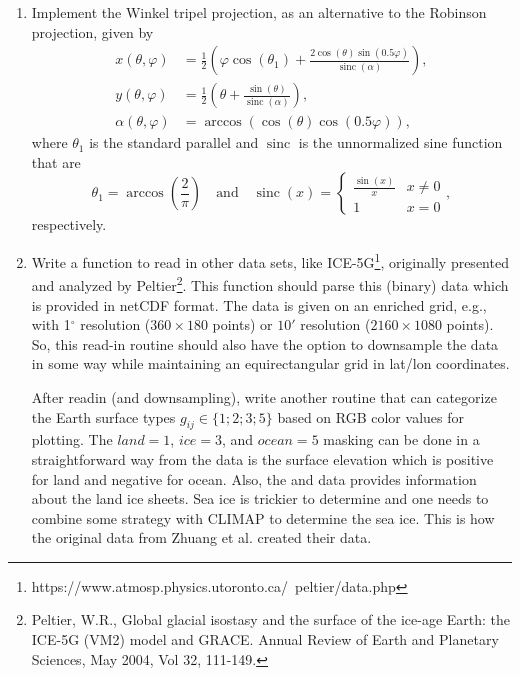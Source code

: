 \documentclass[10pt]{scrartcl}
\DeclareMathOperator{\sinc}{sinc}
\begin{document}
\begin{enumerate}
\item Implement the Winkel tripel projection, as an alternative to the Robinson projection, given by
\[
\begin{aligned}
	x\left(\theta, \varphi \right) &= \frac{1}{2}\left(\varphi \cos\left(\theta_1\right) + \frac{2\cos(\theta)\sin\left(0.5 \varphi\right)}{\sinc(\alpha)}\right),\\[0.1cm]
	y\left( \theta, \varphi \right) &= \frac{1}{2}\left(\theta + \frac{\sin(\theta)}{\sinc(\alpha)}\right),\\[0.1cm]
	\alpha(\theta, \varphi) &= \arccos\left(\cos(\theta)\cos(0.5 \varphi)\right),
\end{aligned}
\]
where $\theta_1$ is the standard parallel and $\sinc$ is the unnormalized sine function that are
\[
\theta_1 = \arccos\left(\frac{2}{\pi}\right)
\quad
\text{and}
\quad
\sinc(x) = 
\begin{cases}
\frac{\sin(x)}{x} & x \ne 0 \\[0.1cm]
1 & x = 0
\end{cases},
\]
respectively.
\item Write a function to read in other data sets, like ICE-5G\footnote{https://www.atmosp.physics.utoronto.ca/~peltier/data.php}, originally presented and analyzed by Peltier\footnote{Peltier, W.R., Global glacial isostasy and the surface of the ice-age Earth: the ICE-5G (VM2) model and GRACE. Annual Review of Earth and Planetary Sciences, May 2004, Vol 32, 111-149.}. This function should parse this (binary) data which is provided in netCDF format. The data is given on an enriched grid, e.g., with 1$^\circ$ resolution ($360 \times 180$ points) or $10'$ resolution ($2160 \times 1080$ points). So, this read-in routine should also have the option to downsample the data in some way while maintaining an equirectangular grid in lat/lon coordinates.

After readin (and downsampling), write another routine that can categorize the Earth surface types $g_{ij} \in \{1;2;3;5\}$ based on RGB color values for plotting.
The $land=1$, $ice=3$, and $ocean=5$ masking can be done in a straightforward way from the \small\texttt{} \normalsize data is the surface elevation which is positive for land and negative for ocean. Also, the \small\texttt{} \normalsize and \small\texttt{} \normalsize data provides information about the land ice sheets. Sea ice is trickier to determine and one needs to combine some strategy with CLIMAP to determine the sea ice. This is how the original data from Zhuang et al. created their data.


\end{enumerate}
\end{document}
